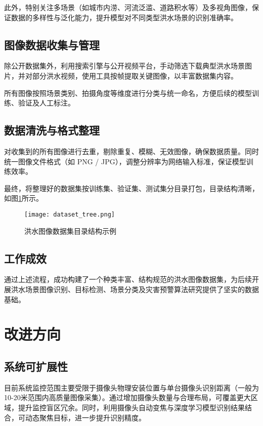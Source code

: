 此外，特别关注多场景（如城市内涝、河流泛滥、道路积水等）及多视角图像，保证数据的多样性与泛化能力，提升模型对不同类型洪水场景的识别准确率。

\subsection{图像数据收集与管理}

除公开数据集外，利用搜索引擎与公开视频平台，手动筛选下载典型洪水场景图片，并对部分洪水视频，使用工具按帧提取关键图像，以丰富数据集内容。

所有图像按照场景类别、拍摄角度等维度进行分类与统一命名，方便后续的模型训练、验证及人工标注。

\subsection{数据清洗与格式整理}

对收集到的所有图像进行去重，剔除重复、模糊、无效图像，确保数据质量。同时统一图像文件格式（如 PNG / JPG），调整分辨率为网络输入标准，保证模型训练效率。

最终，将整理好的数据集按训练集、验证集、测试集分目录打包，目录结构清晰，如图\ref{fig:dataset_tree}所示。

\begin{figure}[H]
    \centering
    \texttt{[image: dataset\_tree.png]}
    \caption{洪水图像数据集目录结构示例}
    \label{fig:dataset_tree}
\end{figure}

\subsection{工作成效}

通过上述流程，成功构建了一个种类丰富、结构规范的洪水图像数据集，为后续开展洪水场景图像识别、目标检测、场景分类及灾害预警算法研究提供了坚实的数据基础。


\section{改进方向}

\subsection{系统可扩展性}

目前系统监控范围主要受限于摄像头物理安装位置与单台摄像头识别距离（一般为10-20米范围内高质量图像采集）。通过增加摄像头数量与合理布局，可覆盖更大区域，提升监控盲区冗余。同时，利用摄像头自动变焦与深度学习模型识别结果结合，可动态聚焦目标，进一步提升识别精度。

